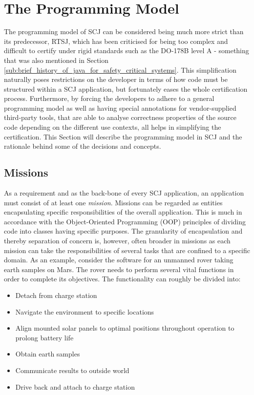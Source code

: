 \section{The Programming Model}
\label{section:programmingmodel}
The programming model of SCJ can be considered being much more strict than its predecessor, RTSJ, which has been criticised for being too complex and difficult to certify under rigid standards such as the DO-178B level A - something that was also mentioned in Section \ref{sub:brief_history_of_java_for_safety_critical_systems}. This simplification naturally poses restrictions on the developer in terms of how code must be structured within a SCJ application, but fortunately eases the whole certification process. Furthermore, by forcing the developers to adhere to a general programming model as well as having special annotations for vendor-supplied third-party tools, that are able to analyse correctness properties of the source code depending on the different use contexts, all helps in simplifying the certification. This Section will describe the programming model in SCJ and the rationale behind some of the decisions and concepts.


\subsection{Missions}
As a requirement and as the back-bone of every SCJ application, an application must consist of at least one \textit{mission}. Missions can be regarded as entities encapsulating specific responsibilities of the overall application. This is much in accordance with the Object-Oriented Programming (OOP) principles of dividing code into classes having specific purposes. The granularity of encapsulation and thereby separation of concern is, however, often broader in missions as each mission can take the responsibilities of several tasks that are confined to a specific domain. As an example, consider the software for an unmanned rover taking earth samples on Mars. The rover needs to perform several vital functions in order to complete its objectives. The functionality can roughly be divided into:

\begin{itemize}
	\item Detach from charge station
	\item Navigate the environment to specific locations
	\item Align mounted solar panels to optimal positions throughout operation to prolong battery life
	\item Obtain earth samples
	\item Communicate results to outside world
	\item Drive back and attach to charge station
\end{itemize}

